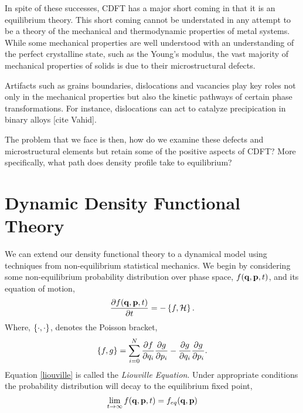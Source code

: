 In spite of these successes, CDFT has a major short coming in that it is an
equilibrium theory. This short coming cannot be understated in any attempt to
be a theory of the mechanical and thermodynamic properties of metal systems.
While some mechanical properties are well understood with an understanding of
the perfect crystalline state, such as the Young's modulus, the vast majority
of mechanical properties of solids is due to their microstructural defects.

Artifacts such as grains boundaries, dislocations and vacancies play key roles
not only in the mechanical properties but also the kinetic pathways of certain
phase transformations. For instance, dislocations can act to catalyze
precipication in binary alloys [cite Vahid].

The problem that we face is then, how do we examine these defects and
microstructural elements but retain some of the positive aspects of CDFT? More
specifically, what path does density profile take to equilibrium?

\section{Dynamic Density Functional Theory} %

We can extend our density functional theory to a dynamical model using
techniques from non-equilibrium statistical mechanics. We begin by considering
some non-equilibrium probability distribution over phase space, $f(\mathbf{q}, \mathbf{p}, t)$,
and its equation of motion,
%
\begin{equation}
    \label{liouville}
    \frac{\partial f(\mathbf{q}, \mathbf{p}, t)}{\partial t} = -\left\lbrace f, \mathcal{H} \right\rbrace.
\end{equation}
%
Where, $\left\lbrace \cdot, \cdot \right\rbrace$, denotes the Poisson bracket,
%
\begin{equation}
    \left\lbrace f, g \right\rbrace = \sum_{i = 0}^N \frac{\partial f}{\partial q_i}
        \frac{\partial g}{\partial p_i} - \frac{\partial g}{\partial q_i}
        \frac{\partial g}{\partial p_i}.
\end{equation}
%
Equation \ref{liouville} is called the \textit{Liouville Equation}. Under appropriate conditions the probability distribution will decay to the equilibrium fixed point,
%
\begin{equation}
    \lim_{t \rightarrow \infty} f(\mathbf{q}, \mathbf{p}, t) = f_{eq}(\mathbf{q}, \mathbf{p})
\end{equation}
%

